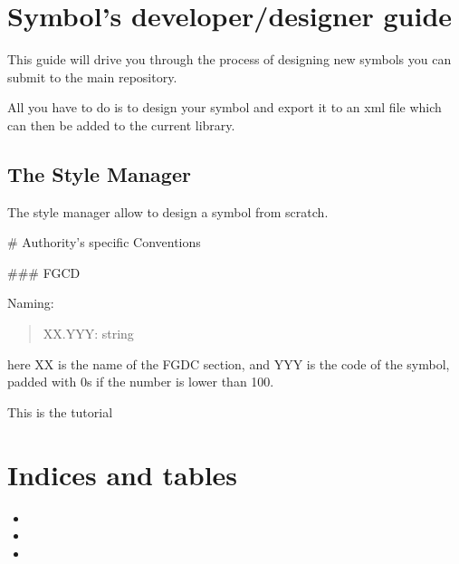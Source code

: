 \documentclass[letterpaper,10pt,english]{sphinxmanual}
\begin{document}
\chapter{Symbol’s developer/designer guide}
\label{\detokenize{developers_guide:symbol-s-developer-designer-guide}}
This guide will drive you through the process of designing new symbols you can submit to the main repository.

All you have to do is to design your symbol and export it to an xml file which can then be added to the current library.


\section{The Style Manager}
\label{\detokenize{developers_guide:the-style-manager}}
The style manager allow to design a symbol from scratch.

\noindent{}

\# Authority’s specific Conventions

\#\#\# FGCD

Naming:
\begin{quote}

XX.YYY: string
\end{quote}

here XX is the name of the FGDC section, and YYY is the code of the symbol, padded with 0s if the number is lower than 100.

This is the tutorial


\chapter{Indices and tables}
\label{\detokenize{index:indices-and-tables}}\begin{itemize}
\item {} 

\item {} 

\item {} 

\end{itemize}



\renewcommand{\indexname}{Index}
\printindex
\end{document}
